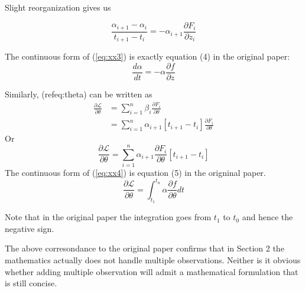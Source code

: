 \documentclass{article}
\newcommand{\LL}{{\mathcal L}}
\begin{document}
Slight reorganization gives us

\begin{equation}
	\label{eq:xx3}
\frac{\alpha_{i+1} - \alpha_{i}}{t_{i+1} - t_i} = -\alpha_{i+1} \frac{\partial F_i}{\partial z_i}
\end{equation}

The continuous form of (\ref{eq:xx3}) is exactly equation (4) in the original paper:
$$
\frac{d\alpha}{dt}  = -\alpha \frac{\partial f}{\partial z}
$$

Similarly, (ref{eq:theta}) can be written as
\begin{equation*}
\begin{split}
	\frac{\partial \LL}{\partial \theta}
	 &= \sum_{i=1}^{n} \beta_i \frac{\partial F_i}{\partial \theta} \\
	 &= \sum_{i=1}^{n} \alpha_{i+1}[t_{i+1} - t_i] \frac{\partial F_i}{\partial \theta} 
\end{split}
\end{equation*}
Or
\begin{equation}
	\label{eq:xx4}
	\frac{\partial \LL}{\partial \theta}
	= \sum_{i=1}^{n} \alpha_{i+1} \frac{\partial F_i}{\partial \theta} [t_{i+1} - t_i]
\end{equation}
The continuous form of (\ref{eq:xx4}) is equation (5) in the origninal paper.
$$
	\frac{\partial \LL}{\partial \theta}
	= \int_{t_1}^{t_n} \alpha \frac{\partial f}{\partial \theta} dt
$$

Note that in the original paper the integration goes from $t_1$ to $t_0$ and hence the negative sign.

The above corresondance to the original paper confirms that in Section 2 the mathematics actually does not handle multiple observations.  Neither is it obvious whether adding multiple observation will admit a mathematical formulation that is still concise.
\end{document}
